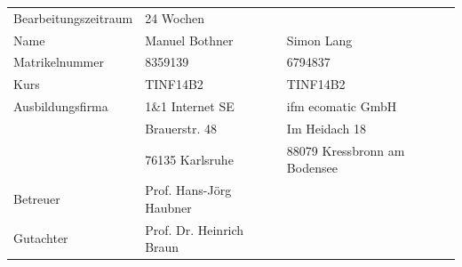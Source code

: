 \begin{flushleft}
	\begin{tabular}{p{4cm} p{6cm} p{6cm}}
		Bearbeitungszeitraum & 24 Wochen  &\\
		Name & Manuel Bothner & Simon Lang\\
		Matrikelnummer & 8359139 & 6794837\\
		Kurs & TINF14B2 & TINF14B2\\
		Ausbildungsfirma & 1\&1 Internet SE & ifm ecomatic GmbH\\
		& Brauerstr. 48 & Im Heidach 18\\
		& 76135 Karlsruhe & 88079 Kressbronn am Bodensee\\
		Betreuer & Prof. Hans-Jörg Haubner & \\
		Gutachter & Prof. Dr. Heinrich Braun & \\
	\end{tabular}
\end{flushleft}